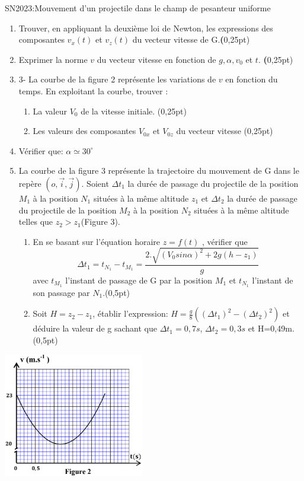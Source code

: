 \documentclass[12pt]{article}
\begin{document}
\begin{Box2}{SN2023:Mouvement d’un projectile dans le champ de pesanteur uniforme}
\begin{enumerate}
  \item Trouver, en appliquant la deuxième loi de Newton, les expressions
    des composantes $v_x(t)$ et $v_z(t)$ du vecteur vitesse de G.\textbf(0,25pt)
  \item Exprimer la norme $v$ du vecteur vitesse en fonction de $g, \alpha, v_0$ et $t$. \textbf(0,25pt)
  \item 3- La courbe de la figure 2 représente les variations de $v$ en fonction du temps. En exploitant la courbe, trouver :
    \begin{enumerate}
      \item La valeur $V_0$ de la vitesse initiale. (0,25pt)
      \item Les valeurs des composantes $V_{0x}$ et $V_{0z}$ du vecteur vitesse (0,25pt)
    \end{enumerate}
  \item Vérifier que: $\alpha \simeq 30^{\circ}$
  \item La courbe de la figure 3 représente la trajectoire du
mouvement de G dans le repère $(o, \vec{i}, \vec{j})$.
    Soient $\Delta{t_1}$ la durée de passage du projectile de la position
$M_1$ à la position $N_1$ situées à la même altitude
$z_1$ et $\Delta{t_2}$ la
durée de passage du projectile de la position $M_2$ à la position $N_2$ situées à la même altitude telles que $z_2 > z_1$(Figure 3).
\begin{enumerate}
  \item En se basant sur l’équation horaire $z =f(t)$ , vérifier que $$\Delta{t_1} = t_{N_1} - t_{M_1} = \frac{2.\sqrt{(V_0sin\alpha)^2 + 2g(h-z_1)}}{g}$$ avec $t_{M_1}$ l’instant de passage de
G par la position $M_1$ et $t_{N_1}$ l’instant de son passage par $N_1$.(0,5pt)
\item Soit $H= z_2 - z_1$, établir l’expression: $H = \frac{g}{8}((\Delta{t_1})^2 - (\Delta{t_2})^2 )$ et déduire la valeur de g sachant que $\Delta{t_1} = 0,7s$, $\Delta{t_2} = 0,3s$ et H=0,49m.(0,5pt)
\end{enumerate}
\end{enumerate}
  \begin{center}
	\includegraphics[width=0.46\textwidth]{./img/vitesse_courbe.png}

\end{center}
\end{Box2}
\end{document}
